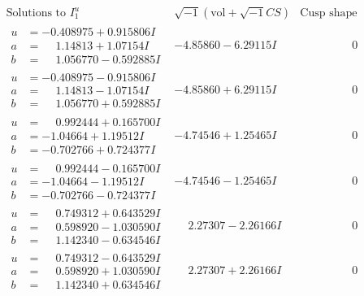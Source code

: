 \documentclass[1p]{elsarticle_modified}
\theoremstyle{definition}
\newcommand{\I}{\sqrt{-1}}
\begin{document}
$$\begin{array}{c|c|c}  
\text{Solutions to }I^u_{1}& \I (\text{vol} + \sqrt{-1}CS) & \text{Cusp shape}\\
 \hline 
\begin{aligned}
u &= -0.408975 + 0.915806 I \\
a &= \phantom{-}1.14813 + 1.07154 I \\
b &= \phantom{-}1.056770 - 0.592885 I\end{aligned}
 & -4.85860 - 6.29115 I & \phantom{-0.000000 } 0 \\ \hline\begin{aligned}
u &= -0.408975 - 0.915806 I \\
a &= \phantom{-}1.14813 - 1.07154 I \\
b &= \phantom{-}1.056770 + 0.592885 I\end{aligned}
 & -4.85860 + 6.29115 I & \phantom{-0.000000 } 0 \\ \hline\begin{aligned}
u &= \phantom{-}0.992444 + 0.165700 I \\
a &= -1.04664 + 1.19512 I \\
b &= -0.702766 + 0.724377 I\end{aligned}
 & -4.74546 + 1.25465 I & \phantom{-0.000000 } 0 \\ \hline\begin{aligned}
u &= \phantom{-}0.992444 - 0.165700 I \\
a &= -1.04664 - 1.19512 I \\
b &= -0.702766 - 0.724377 I\end{aligned}
 & -4.74546 - 1.25465 I & \phantom{-0.000000 } 0 \\ \hline\begin{aligned}
u &= \phantom{-}0.749312 + 0.643529 I \\
a &= \phantom{-}0.598920 - 1.030590 I \\
b &= \phantom{-}1.142340 - 0.634546 I\end{aligned}
 & \phantom{-}2.27307 - 2.26166 I & \phantom{-0.000000 } 0 \\ \hline\begin{aligned}
u &= \phantom{-}0.749312 - 0.643529 I \\
a &= \phantom{-}0.598920 + 1.030590 I \\
b &= \phantom{-}1.142340 + 0.634546 I\end{aligned}
 & \phantom{-}2.27307 + 2.26166 I & \phantom{-0.000000 } 0 \\ \hline\begin{aligned}

\end{aligned}
\end{array}$$
\end{document}
